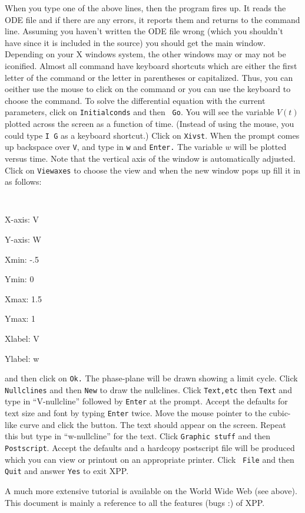 \documentclass{article}
\begin{document}
When you type one of the above lines, then the program fires up. It
reads the ODE file and if there are any errors, it reports them and
returns to the command line.  Assuming you haven't written the ODE
file wrong (which you shouldn't have since it is included in the
source) you should get the main window.  Depending on your X windows
system, the other windows may or may not be iconified.  Almost all
command have keyboard shortcuts which are either the first letter of
the command or the letter in parentheses or capitalized. Thus, you can
oeither use the mouse to click on the command or you can use the
keyboard to choose the command.  To solve the differential equation
with the current parameters, click on {\tt Initialconds} and then {\tt
Go}. You will see the variable $V(t)$ plotted across the screen as a
function of time.  (Instead of using the mouse, you could type {\tt I
G} as a keyboard shortcut.)  Click on {\tt Xivst}.  When the prompt
comes up backspace over {\tt V}, and type in {\tt w} and {\tt Enter.}
The variable $w$ will be plotted versus time.  Note that the vertical
axis of the window is automatically adjusted.  Click on {\tt Viewaxes}
to choose the view and when the new window pops up fill it in as follows:
\begin{itemize} {\tt
\item X-axis: V
\item Y-axis: W
\item Xmin: -.5
\item Ymin: 0
\item Xmax: 1.5
\item Ymax: 1
\item Xlabel: V
\item Ylabel: w
}
\end{itemize}
and then click on {\tt Ok.}  The phase-plane will be drawn showing a
limit cycle. Click {\tt Nullclines} and then {\tt New} to draw the
nullclines. Click {\tt Text,etc} then {\tt Text} and type in
``V-nullcline'' followed by {\tt Enter} at the prompt.  Accept the
defaults for text size and font by typing {\tt Enter} twice.  Move the
mouse pointer to the cubic-like curve and click the button.  The text
should appear on the screen.  Repeat this but type in ``w-nullcline''
for the text.  Click {\tt Graphic stuff} and then {\tt Postscript}.
Accept the defaults and a hardcopy postscript file will be produced
which you can view or printout on an appropriate printer.  Click {\tt
File} and then {\tt Quit} and answer {\tt Yes} to exit XPP.  

A much more extensive tutorial is available on the World Wide Web (see
above). This document is mainly a reference to all the features (bugs
:) of XPP.
\end{document}
